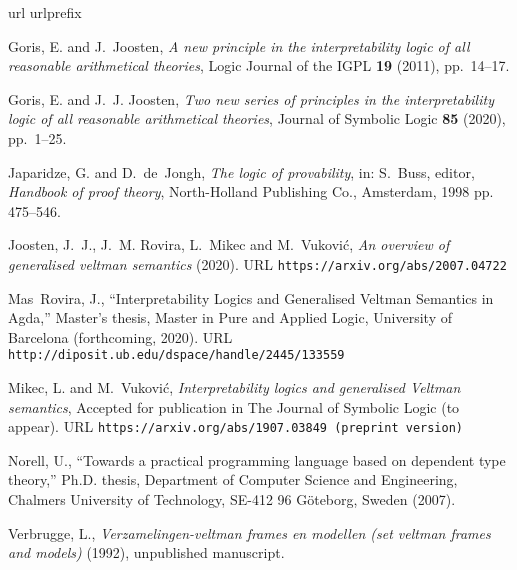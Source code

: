 \documentclass[twoside]{aiml20}
\begin{document}

% 



\begin{thebibliography}{1}
\expandafter\ifx\csname url\endcsname\relax
  \def\url#1{\texttt{#1}}\fi
\expandafter\ifx\csname urlprefix\endcsname\relax\def\urlprefix{URL }\fi
\newcommand{\enquote}[1]{``#1''}

Goris, E. and J.~Joosten, \emph{A new principle in the interpretability logic
  of all reasonable arithmetical theories}, Logic Journal of the IGPL
  \textbf{19} (2011), pp.~14--17.

Goris, E. and J.~J. Joosten, \emph{Two new series of principles in the
  interpretability logic of all reasonable arithmetical theories}, Journal of
  Symbolic Logic \textbf{85} (2020), pp.~1--25.

Japaridze, G. and D.~{de}~Jongh, \emph{The logic of provability}, in: S.~Buss,
  editor, \emph{Handbook of proof theory}, North-Holland Publishing Co.,
  Amsterdam, 1998 pp. 475--546.

Joosten, J.~J., J.~M. Rovira, L.~Mikec and M.~Vuković, \emph{An overview of
  generalised veltman semantics} (2020).
\newline\urlprefix\url{https://arxiv.org/abs/2007.04722}

Mas~Rovira, J., \enquote{{I}nterpretability {L}ogics and {G}eneralised
  {V}eltman {S}emantics in {A}gda,} Master's thesis, Master in Pure and Applied
  Logic, University of Barcelona (forthcoming, 2020).
\newline\urlprefix\url{http://diposit.ub.edu/dspace/handle/2445/133559}

Mikec, L. and M.~Vuković, \emph{Interpretability logics and generalised
  {V}eltman semantics}, Accepted for publication in The Journal of Symbolic
  Logic  (to appear).
\newline\urlprefix\url{https://arxiv.org/abs/1907.03849 (preprint version)}

Norell, U., \enquote{Towards a practical programming language based on
  dependent type theory,} Ph.D. thesis, Department of Computer Science and
  Engineering, Chalmers University of Technology, SE-412 96 G\"{o}teborg,
  Sweden (2007).

Verbrugge, L., \emph{Verzamelingen-veltman frames en modellen (set veltman
  frames and models)} (1992), unpublished manuscript.

\end{thebibliography}
\end{document}
